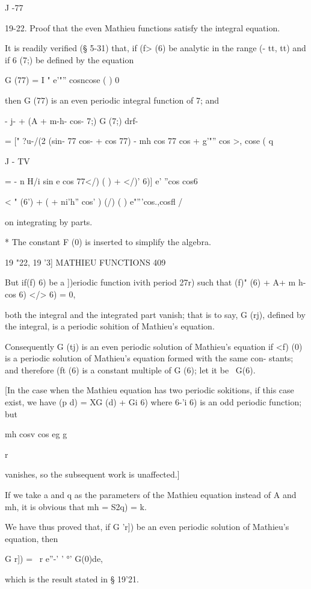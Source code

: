 J -77

19-22. Proof that the even Mathieu functions satisfy the integral
equation.

It is readily verified (§ 5-31) that, if (f> (6) be analytic in the
range (- tt, tt) and if 6 (7;) be defined by the equation

G (77) = I " e'"'' cosncose ( ) 0

then G (77) is an even periodic integral function of 7; and

- j- + (A + m-h- cos- 7;) G (7;) drf-

= [" ?u-/(2 (sin- 77 cos- + cos 77) - mh cos 77 cos + g'"'' cos >,
cose ( q

J - TV

= - n H/i sin e cos 77</) ( ) + </)' 6)] e' ''cos cos6

 < " (6') + ( + ni'h'' cos' ) (/) ( ) e"'''cos.,cosfl /

on integrating by parts.

* The constant F (0) is inserted to simplify the algebra.

19 "22, 19 '3] MATHIEU FUNCTIONS 409

But if(f) 6) be a ])eriodic function ivith period 27r) such that (f)"
(6) + A+ m h- cos 6) </> 6) = 0,

both the integral and the integrated part vanish; that is to say, G
(rj), defined by the integral, is a periodic sohition of Mathieu's
equation.

Consequently G (tj) is an even periodic solution of Mathieu's equation
if <f) (0) is a periodic solution of Mathieu's equation formed with
the same con- stants; and therefore (ft (6) is a constant multiple of
G (6); let it be \ G(6).

[In the case when the Mathieu equation has two periodic sokitions, if
this case exist, we have (p d) = XG (d) + Gi 6) where 6-'i 6) is an
odd periodic function; but

 mh cosv cos eg g

r

vanishes, so the subsequent work is unaffected.]

If we take a and q as the parameters of the Mathieu equation instead
of A and mh, it is obvious that mh = \/ S2q) = k.

We have thus proved that, if G 'r]) be an even periodic solution of
Mathieu's equation, then

G r]) = \ r e''-' ' °' G(0)de,

which is the result stated in § 19'21.


